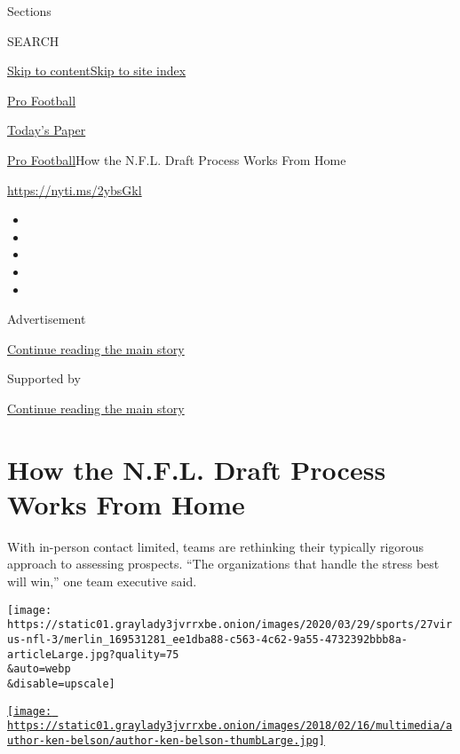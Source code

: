 Sections

SEARCH

\protect\hyperlink{site-content}{Skip to
content}\protect\hyperlink{site-index}{Skip to site index}

\href{https://www.nytimes3xbfgragh.onion/section/sports/football}{Pro
Football}

\href{https://myaccount.nytimes3xbfgragh.onion/auth/login?response_type=cookie\&client_id=vi}{}

\href{https://www.nytimes3xbfgragh.onion/section/todayspaper}{Today's
Paper}

\href{/section/sports/football}{Pro Football}\textbar{}How the N.F.L.
Draft Process Works From Home

\url{https://nyti.ms/2ybsGkl}

\begin{itemize}
\item
\item
\item
\item
\item
\end{itemize}

Advertisement

\protect\hyperlink{after-top}{Continue reading the main story}

Supported by

\protect\hyperlink{after-sponsor}{Continue reading the main story}

\hypertarget{how-the-nfl-draft-process-works-from-home}{%
\section{How the N.F.L. Draft Process Works From
Home}\label{how-the-nfl-draft-process-works-from-home}}

With in-person contact limited, teams are rethinking their typically
rigorous approach to assessing prospects. ``The organizations that
handle the stress best will win,'' one team executive said.

\texttt{[image: https://static01.graylady3jvrrxbe.onion/images/2020/03/29/sports/27virus-nfl-3/merlin\_169531281\_ee1dba88-c563-4c62-9a55-4732392bbb8a-articleLarge.jpg?quality=75\\\&auto=webp\\\&disable=upscale]}

\href{https://www.nytimes3xbfgragh.onion/by/ken-belson}{\texttt{[image: https://static01.graylady3jvrrxbe.onion/images/2018/02/16/multimedia/author-ken-belson/author-ken-belson-thumbLarge.jpg]}}

